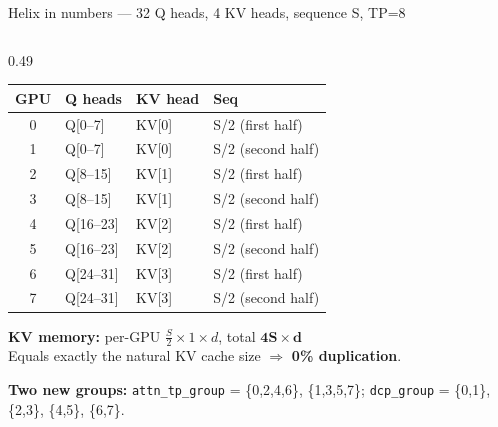 \documentclass[aspectratio=169,10pt]{beamer}
\begin{document}
\begin{frame}{Helix in numbers --- 32 Q heads, 4 KV heads, sequence S, TP=8}
\begin{columns}[T,onlytextwidth]
\begin{column}{0.49\textwidth}
      \vspace{0.3em}
      \begin{tabular}{@{}clll@{}}
        \toprule
        GPU & Q heads & KV head & Seq \\
        \midrule
        0 & Q[0--7]   & KV[0] & S/2 (first half)  \\
        1 & Q[0--7]   & KV[0] & S/2 (second half) \\
        2 & Q[8--15]  & KV[1] & S/2 (first half)  \\
        3 & Q[8--15]  & KV[1] & S/2 (second half) \\
        4 & Q[16--23] & KV[2] & S/2 (first half)  \\
        5 & Q[16--23] & KV[2] & S/2 (second half) \\
        6 & Q[24--31] & KV[3] & S/2 (first half)  \\
        7 & Q[24--31] & KV[3] & S/2 (second half) \\
        \bottomrule
      \end{tabular}

      \vspace{0.4em}
      \textbf{KV memory:} per-GPU $\tfrac{S}{2}\!\times\!1\!\times\!d$, total $\mathbf{4S\!\times\!d}$ \\
      Equals exactly the natural KV cache size $\Rightarrow$ \textcolor{slgreen}{\textbf{0\% duplication}}.

      \vspace{0.4em}
      \textbf{Two new groups:} \texttt{attn\_tp\_group} = \{0,2,4,6\}, \{1,3,5,7\}; \texttt{dcp\_group} = \{0,1\}, \{2,3\}, \{4,5\}, \{6,7\}.
    \end{column}
  \end{columns}
\end{frame}
\end{document}
